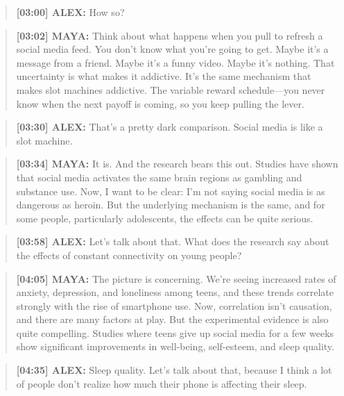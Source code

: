 \documentclass[
    language=english,
    doctype=podcast-script,
    institution=none,
]{../../omnilatex}
\begin{document}
\begin{quote}
\textbf{[03:00] ALEX:} How so?
\end{quote}

\begin{quote}
\textbf{[03:02] MAYA:} Think about what happens when you pull to refresh a social media feed. You don't know what you're going to get. Maybe it's a message from a friend. Maybe it's a funny video. Maybe it's nothing. That uncertainty is what makes it addictive. It's the same mechanism that makes slot machines addictive. The variable reward schedule---you never know when the next payoff is coming, so you keep pulling the lever.
\end{quote}

\begin{quote}
\textbf{[03:30] ALEX:} That's a pretty dark comparison. Social media is like a slot machine.
\end{quote}

\begin{quote}
\textbf{[03:34] MAYA:} It is. And the research bears this out. Studies have shown that social media activates the same brain regions as gambling and substance use. Now, I want to be clear: I'm not saying social media is as dangerous as heroin. But the underlying mechanism is the same, and for some people, particularly adolescents, the effects can be quite serious.
\end{quote}

\begin{quote}
\textbf{[03:58] ALEX:} Let's talk about that. What does the research say about the effects of constant connectivity on young people?
\end{quote}

\begin{quote}
\textbf{[04:05] MAYA:} The picture is concerning. We're seeing increased rates of anxiety, depression, and loneliness among teens, and these trends correlate strongly with the rise of smartphone use. Now, correlation isn't causation, and there are many factors at play. But the experimental evidence is also quite compelling. Studies where teens give up social media for a few weeks show significant improvements in well-being, self-esteem, and sleep quality.
\end{quote}

\begin{quote}
\textbf{[04:35] ALEX:} Sleep quality. Let's talk about that, because I think a lot of people don't realize how much their phone is affecting their sleep.
\end{quote}
\end{document}
